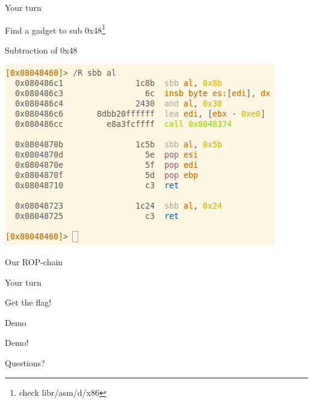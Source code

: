 \documentclass{beamer}
\begin{document}
\begin{frame}{Your turn}
    \begin{center}
        \Large Find a gadget to \alert{sub 0x48}\footnote{check \alert{libr/asm/d/x86}}
    \end{center}
\end{frame}


\begin{frame}{Subtraction of 0x48}
    \begin{center}
            \includegraphics[width=\textwidth]{exp400_sbb.png}
    \end{center}
\end{frame}

\begin{frame}{Our ROP-chain}
\end{frame}

\begin{frame}{Your turn}
    \begin{center}
        \Large Get the flag!
    \end{center}
\end{frame}

\begin{frame}{Demo}
    \begin{center}
        \Large Demo!
    \end{center}
\end{frame}

\begin{frame}
    \begin{center}
        \Large Questions?
    \end{center}
\end{frame}
\end{document}
